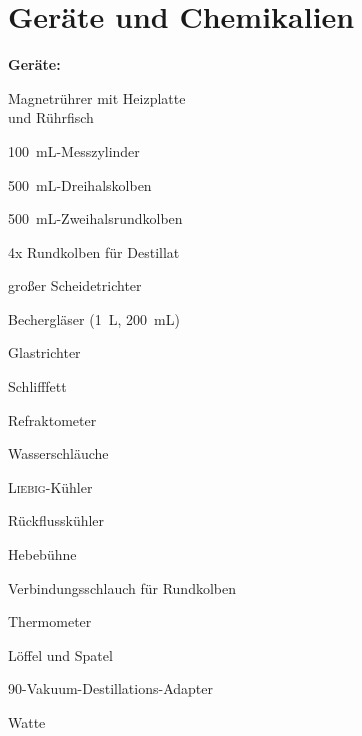 \section{Geräte und Chemikalien}
\label{sec:geraete}

\textbf{Geräte:}
\begin{itemize}
	\begin{minipage}{0.45\textwidth}
		\item Magnetrührer mit Heizplatte \\ und Rührfisch
		\item \SI{100}{\milli \liter}-Messzylinder 
		\item \SI{500}{\milli \liter}-Dreihalskolben
		\item \SI{500}{\milli \liter}-Zweihalsrundkolben
		\item 4x Rundkolben für Destillat
		\item großer Scheidetrichter
		\item Bechergläser (\SI{1}{\liter}, \SI{200}{\milli \liter})
		\item Glastrichter
		\item Schlifffett
	\end{minipage}
	\begin{minipage}{0.45\textwidth}
		\item Refraktometer
		\item Wasserschläuche
		\item \textsc{Liebig}-Kühler
		\item Rückflusskühler
		\item Hebebühne
		\item Verbindungsschlauch für Rundkolben
		\item Thermometer
		\item Löffel und Spatel
		\item \SI{90}{\degrees}-Vakuum-Destillations-Adapter
		\item Watte
	\end{minipage}
\end{itemize}

\newpage

